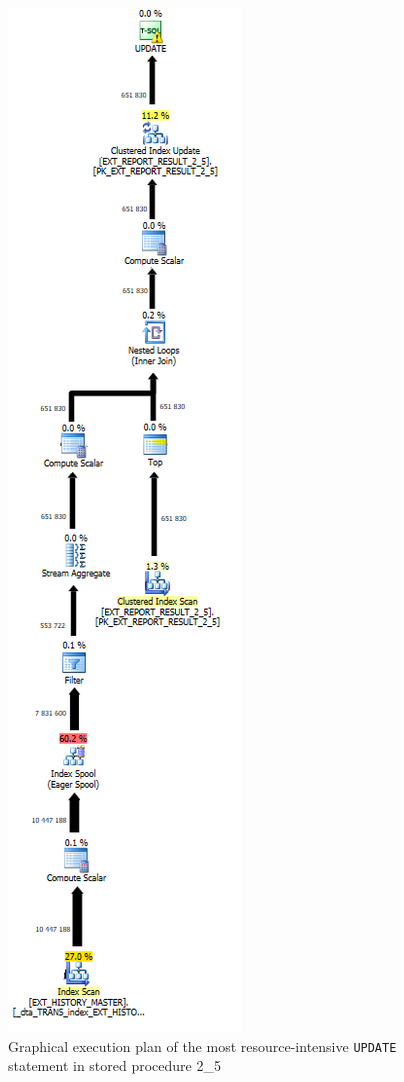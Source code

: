 \documentclass{cslthse-msc}
\begin{document}
\begin{figure}
  \vspace{-20pt}
  \begin{center}
    \includegraphics[scale=0.8]{Pictures/plan.png}
  \end{center}
  \vspace{-20pt}
  \caption{Graphical execution plan of the most resource-intensive \texttt{UPDATE} statement in stored procedure 2\_5}
  \label{2_5 ep}
  \vspace{-40pt}
\end{figure}
\end{document}
